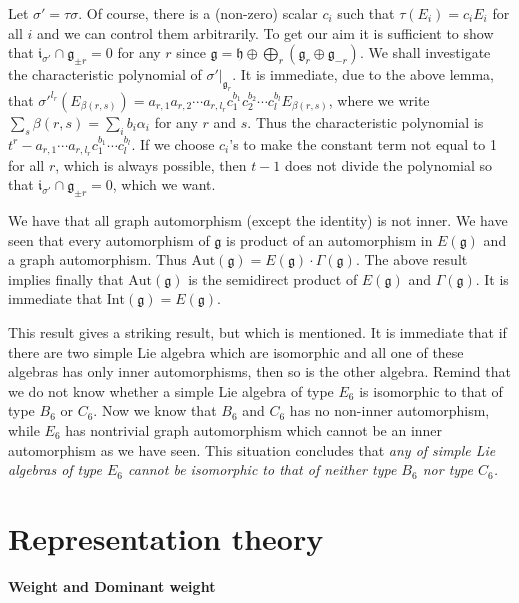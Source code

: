 \documentclass{article}
\newcommand{\lie}[1]{\mathfrak{#1}}
\begin{document}
Let $\sigma' = \tau \sigma$.
Of course, there is a (non-zero) scalar $c_i$ such that $\tau(E_i) = c_i E_i$ for all $i$ and we can control them arbitrarily.
To get our aim it is sufficient to show that $\lie{i}_{\sigma'} \cap \lie{g}_{\pm r} = 0$ for any $r$ since $\lie{g} = \lie{h} \oplus \bigoplus_r (\lie{g}_r \oplus \lie{g}_{-r})$.
We shall investigate the characteristic polynomial of $\sigma'|_{\lie{g}_r}$.
It is immediate, due to the above lemma, that $\sigma'^{l_r}(E_{\beta(r, s)}) = a_{r, 1} a_{r, 2} \cdots a_{r, l_r} c_1^{b_1} c_2^{b_2} \cdots c_l^{b_l} E_{\beta(r, s)}$, where we write $\sum_s \beta(r, s) = \sum_i b_i \alpha_i$ for any $r$ and $s$.
Thus the characteristic polynomial is $t^r - a_{r, 1} \cdots a_{r, l_r} c_1^{b_1} \cdots c_l^{b_l}$.
If we choose $c_i$'s to make the constant term not equal to 1 for all $r$, which is always possible, then $t - 1$ does not divide the polynomial so that $ \lie{i}_{\sigma'} \cap \lie{g}_{\pm r} = 0$, which we want.

We have that all graph automorphism (except the identity) is not inner.
We have seen that every automorphism of $\lie{g}$ is product of an automorphism in $E(\lie{g})$ and a graph automorphism.
Thus $\textrm{Aut}(\lie{g}) = E(\lie{g}) \cdot \Gamma(\lie{g})$.
The above result implies finally that $\textrm{Aut}(\lie{g})$ is the semidirect product of $E(\lie{g})$ and $\Gamma(\lie{g})$.
It is immediate that $\textrm{Int}(\lie{g}) = E(\lie{g})$.

This result gives a striking result, but which is mentioned.
It is immediate that if there are two simple Lie algebra which are isomorphic and all one of these algebras has only inner automorphisms, then so is the other algebra.
Remind that we do not know whether a simple Lie algebra of type $E_6$ is isomorphic to that of type $B_6$ or $C_6$.
Now we know that $B_6$ and $C_6$ has no non-inner automorphism, while $E_6$ has nontrivial graph automorphism which cannot be an inner automorphism as we have seen.
This situation concludes that \textit{any of simple Lie algebras of type $E_6$ cannot be isomorphic to that of neither type $B_6$ nor type $C_6$.}

\newpage

\part{Representation theory}

\newpage

\textbf{Weight and Dominant weight}
\end{document}
